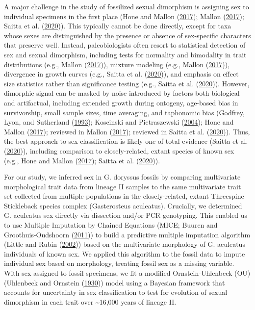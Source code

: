 \documentclass[
  12pt,
]{article}
\begin{document}
A major challenge in the study of fossilized sexual dimorphism is
assigning sex to individual specimens in the first place (Hone and
Mallon (\protect\hyperlink{ref-HoneandMallon2017}{2017}); Mallon
(\protect\hyperlink{ref-Mallon2017}{2017}); Saitta et al.
(\protect\hyperlink{ref-Saittaetal2020}{2020})). This typically cannot
be done directly, except for taxa whose sexes are distinguished by the
presence or absence of sex-specific characters that preserve well.
Instead, paleobiologists often resort to statistical detection of sex
and sexual dimorphism, including tests for normality and bimodality in
trait distributions (e.g., Mallon
(\protect\hyperlink{ref-Mallon2017}{2017})), mixture modeling (e.g.,
Mallon (\protect\hyperlink{ref-Mallon2017}{2017})), divergence in growth
curves (e.g., Saitta et al.
(\protect\hyperlink{ref-Saittaetal2020}{2020})), and emphasis on effect
size statistics rather than significance testing (e.g., Saitta et al.
(\protect\hyperlink{ref-Saittaetal2020}{2020})). However, dimorphic
signal can be masked by noise introduced by factors both biological and
artifactual, including extended growth during ontogeny, age-based bias
in survivorship, small sample sizes, time averaging, and taphonomic bias
(Godfrey, Lyon, and Sutherland
(\protect\hyperlink{ref-Godfreyetal1993}{1993}); Koscinski and
Pietraszewski
(\protect\hyperlink{ref-KoscinskiandPietraszewski2004}{2004}); Hone and
Mallon (\protect\hyperlink{ref-HoneandMallon2017}{2017}); reviewed in
Mallon (\protect\hyperlink{ref-Mallon2017}{2017}); reviewed in Saitta et
al. (\protect\hyperlink{ref-Saittaetal2020}{2020})). Thus, the best
approach to sex classification is likely one of total evidence (Saitta
et al. (\protect\hyperlink{ref-Saittaetal2020}{2020})), including
comparison to closely-related, extant species of known sex (e.g., Hone
and Mallon (\protect\hyperlink{ref-HoneandMallon2017}{2017}); Saitta et
al. (\protect\hyperlink{ref-Saittaetal2020}{2020})).

For our study, we inferred sex in G. doryssus fossils by comparing
multivariate morphological trait data from lineage II samples to the
same multivariate trait set collected from multiple populations in the
closely-related, extant Threespine Stickleback species complex
(Gasterosteus aculeatus). Crucially, we determined G. aculeatus sex
directly via dissection and/or PCR genotyping. This enabled us to use
Multiple Imputation by Chained Equations (MICE; Buuren and
Groothuis-Oudshoorn (\protect\hyperlink{ref-MICE}{2011})) to build a
predictive multiple imputation algorithm (Little and Rubin
(\protect\hyperlink{ref-little2002statistical}{2002})) based on the
multivariate morphology of G. aculeatus individuals of known sex. We
applied this algorithm to the fossil data to impute individual sex based
on morphology, treating fossil sex as a missing variable. With sex
assigned to fossil specimens, we fit a modified Ornstein-Uhlenbeck (OU)
(Uhlenbeck and Ornstein (\protect\hyperlink{ref-OUProcess}{1930})) model
using a Bayesian framework that accounts for uncertainty in sex
classification to test for evolution of sexual dimorphism in each trait
over \textasciitilde16,000 years of lineage II.
\end{document}

